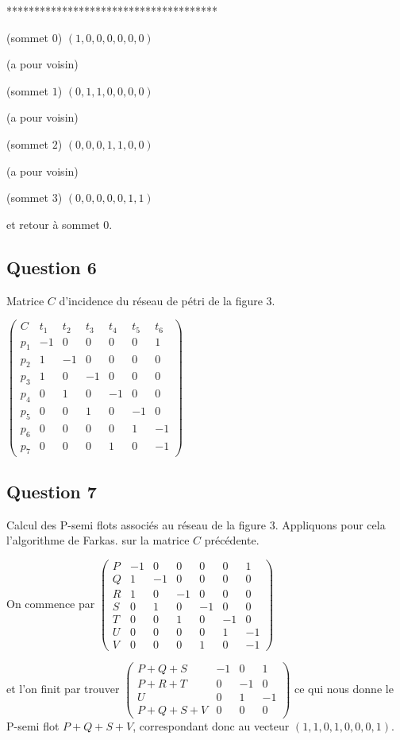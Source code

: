 **************************************

(sommet $0$) $(1, 0, 0, 0, 0, 0, 0)$

(a pour voisin)

(sommet $1$) $(0, 1, 1, 0, 0, 0, 0)$

(a pour voisin)

(sommet $2$) $(0, 0, 0, 1, 1, 0, 0)$

(a pour voisin)

(sommet $3$) $(0, 0, 0, 0, 0, 1, 1)$

et retour à sommet $0$.

\subsection{Question 6}
Matrice $C$ d'incidence du réseau de pétri de la figure $3$.

 $ \begin{pmatrix}
C&t_1&t_2&t_3&t_4&t_5&t_6 \\
p_1& -1&0&0&0&0&1 \\
p_2&1&-1&0&0&0&0 \\
p_3&1&0&-1&0&0&0 \\
p_4&0&1&0&-1&0&0 \\
p_5&0&0&1&0&-1&0 \\
p_6&0&0&0&0&1&-1 \\
p_7&0&0&0&1&0&-1 
\end{pmatrix}$

\subsection{Question 7}
Calcul des P-semi flots associés au réseau de la figure
$3$. Appliquons pour cela l'algorithme de Farkas. sur la matrice $C$
précédente.

On commence par  
$ \begin{pmatrix}
P& -1&0&0&0&0&1 \\
Q&1&-1&0&0&0&0 \\
R&1&0&-1&0&0&0 \\
S&0&1&0&-1&0&0 \\
T&0&0&1&0&-1&0 \\
U&0&0&0&0&1&-1 \\
V&0&0&0&1&0&-1 
\end{pmatrix}$

et l'on finit par trouver 
$ \begin{pmatrix}
P+Q+S& -1&0&1 \\
P+R+T&0&-1&0 \\
U&0&1&-1 \\
P+Q+S+V&0&0&0
\end{pmatrix}$
ce qui nous donne le P-semi flot $P+Q+S+V$, correspondant donc au
vecteur $(1, 1, 0, 1, 0, 0, 0, 1)$.

